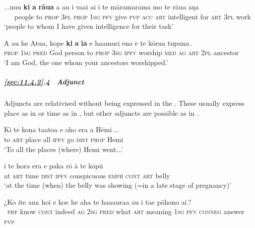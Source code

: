 \ea\label{ex:11.95}
\gll ...nu{\ꞌ}u {\ob}\textbf{ki} \textbf{a} \textbf{rāua} a au i va{\ꞌ}ai ai i te māramarama  mo te rāua aŋa\,{\cb}\\
~~~people {\db}to \textsc{prop} \textsc{3pl} \textsc{prop} \textsc{1sg} \textsc{pfv} give \textsc{pvp} \textsc{acc} \textsc{art} intelligent  for \textsc{art} \textsc{3pl} work\\

\glt 
‘people to whom I have given intelligence for their task’ \textstyleExampleref{[Exo. 28:3]}
\z

\ea\label{ex:11.96}
\gll A au he {\ꞌ}Atua, kope {\ob}\textbf{ki} \textbf{a} \textbf{ia} e ha{\ꞌ}amuri ena e te kōrua tupuna\,{\cb}. \\
\textsc{prop} \textsc{1sg} \textsc{pred} God person {\db}to \textsc{prop} \textsc{3sg} \textsc{ipfv} worship \textsc{med} \textsc{ag} \textsc{art} \textsc{2pl} ancestor \\

\glt 
‘I am God, the one whom your ancestors worshipped.’ \textstyleExampleref{[Mat. 22:32]}
\z

\subparagraph{\ref{sec:11.4.2}.4~ Adjunct} Adjuncts are relativised without being expressed in the . These usually express place as in  or time as in , but other adjuncts are possible as in .

\ea\label{ex:11.97}
\gll Ki te kona ta{\ꞌ}ato{\ꞌ}a {\ob}e oho era a Hēmi\,{\cb}...\\
to \textsc{art} place all {\db}\textsc{ipfv} go \textsc{dist} \textsc{prop} Hemi\\

\glt 
‘To all the places (where) Hemi went...’ \textstyleExampleref{[R476.004]} 
\z

\ea\label{ex:11.98}
\gll {\ꞌ}i te hora era {\ob}e paka rō {\ꞌ}ā te kōpū\,{\cb} \\
at \textsc{art} time \textsc{dist} {\db}\textsc{ipfv} conspicuous \textsc{emph} \textsc{cont} \textsc{art} belly \\

\glt 
‘at the time (when) the belly was showing (=in a late stage of pregnancy)’ \textstyleExampleref{[R301.004]} 
\z

\ea\label{ex:11.99}
\gll ¿Ko {\ꞌ}ite {\ꞌ}ana ho{\ꞌ}i e koe he aha te ha{\ꞌ}aaura{\ꞌ}a {\ob}au i ta{\ꞌ}e pāhono ai\,{\cb}?\\
~\textsc{prf} know \textsc{cont} indeed \textsc{ag} \textsc{2sg} \textsc{pred} what \textsc{art} meaning  {\db}\textsc{1sg} \textsc{pfv} \textsc{conneg} answer \textsc{pvp}\\

